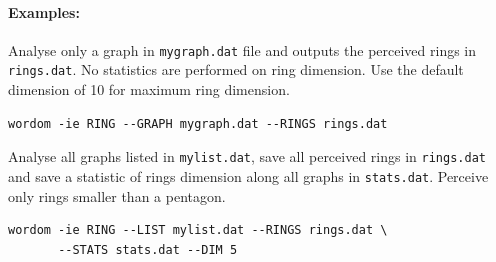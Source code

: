 \documentclass[11pt,twoside,onecolumn,a4paper,openright,notitlepage]{book}[2001/04/21]
\begin{document}

\paragraph*{Examples:}

Analyse only a graph in \verb=mygraph.dat= file and outputs the perceived rings in \verb=rings.dat=. No statistics are performed on ring dimension. Use the default dimension of 10 for maximum ring dimension.

\begin{verbatim}
wordom -ie RING --GRAPH mygraph.dat --RINGS rings.dat
\end{verbatim}


Analyse all graphs listed in \verb=mylist.dat=, save all perceived rings in \verb=rings.dat= and save a statistic of rings dimension along all graphs in \verb=stats.dat=. Perceive only rings smaller than a pentagon.

\begin{verbatim}
wordom -ie RING --LIST mylist.dat --RINGS rings.dat \
       --STATS stats.dat --DIM 5
\end{verbatim}

\clearpage
\end{document}
